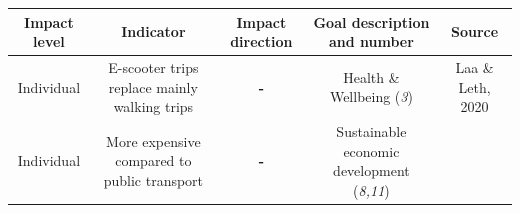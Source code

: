 \documentclass[
]{book}
\begin{document}
\begin{longtable}[]{@{}ccccc@{}}
\toprule
\begin{minipage}[b]{0.17\columnwidth}\centering
Impact level\strut
\end{minipage} & \begin{minipage}[b]{0.16\columnwidth}\centering
Indicator\strut
\end{minipage} & \begin{minipage}[b]{0.17\columnwidth}\centering
Impact direction\strut
\end{minipage} & \begin{minipage}[b]{0.17\columnwidth}\centering
Goal description and number\strut
\end{minipage} & \begin{minipage}[b]{0.17\columnwidth}\centering
Source\strut
\end{minipage}\tabularnewline
\midrule
\endhead
\begin{minipage}[t]{0.17\columnwidth}\centering
Individual\strut
\end{minipage} & \begin{minipage}[t]{0.16\columnwidth}\centering
E-scooter trips replace mainly walking trips\strut
\end{minipage} & \begin{minipage}[t]{0.17\columnwidth}\centering
\textbf{-}\strut
\end{minipage} & \begin{minipage}[t]{0.17\columnwidth}\centering
Health \& Wellbeing (\emph{3})\strut
\end{minipage} & \begin{minipage}[t]{0.17\columnwidth}\centering
Laa \& Leth, 2020\strut
\end{minipage}\tabularnewline
\begin{minipage}[t]{0.17\columnwidth}\centering
Individual\strut
\end{minipage} & \begin{minipage}[t]{0.16\columnwidth}\centering
More expensive compared to public transport\strut
\end{minipage} & \begin{minipage}[t]{0.17\columnwidth}\centering
\textbf{-}\strut
\end{minipage} & \begin{minipage}[t]{0.17\columnwidth}\centering
Sustainable economic development (\emph{8,11})\strut
\end{minipage} & \begin{minipage}[t]{0.17\columnwidth}\centering

\end{minipage}
\end{longtable}
\end{document}
